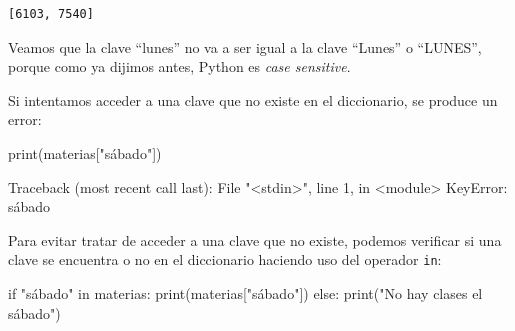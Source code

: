 \documentclass[
  letterpaper,
  DIV=11,
  numbers=noendperiod]{scrreprt}
\newenvironment{Shaded}{\begin{snugshade}}{\end{snugshade}}
\newcommand{\BuiltInTok}[1]{\textcolor[rgb]{0.00,0.23,0.31}{#1}}
\newcommand{\ControlFlowTok}[1]{\textcolor[rgb]{0.00,0.23,0.31}{#1}}
\newcommand{\KeywordTok}[1]{\textcolor[rgb]{0.00,0.23,0.31}{#1}}
\newcommand{\NormalTok}[1]{\textcolor[rgb]{0.00,0.23,0.31}{#1}}
\newcommand{\StringTok}[1]{\textcolor[rgb]{0.13,0.47,0.30}{#1}}
\begin{document}
\begin{verbatim}
[6103, 7540]
\end{verbatim}

Veamos que la clave ``lunes'' no va a ser igual a la clave ``Lunes'' o
``LUNES'', porque como ya dijimos antes, Python es \emph{case
sensitive}.

\begin{tcolorbox}[enhanced jigsaw, bottomrule=.15mm, leftrule=.75mm, opacityback=0, colback=white, toprule=.15mm, bottomtitle=1mm, opacitybacktitle=0.6, rightrule=.15mm, left=2mm, arc=.35mm, coltitle=black, title=\textcolor{quarto-callout-warning-color}{\faExclamationTriangle}\hspace{0.5em}{¡Cuidado! Acceso a Claves que no Existen}, breakable, toptitle=1mm, colframe=quarto-callout-warning-color-frame, titlerule=0mm, colbacktitle=quarto-callout-warning-color!10!white]

Si intentamos acceder a una clave que no existe en el diccionario, se
produce un error:

\begin{Shaded}
\begin{Highlighting}[]
\BuiltInTok{print}\NormalTok{(materias[}\StringTok{"sábado"}\NormalTok{])}
\end{Highlighting}
\end{Shaded}

\begin{Shaded}
\begin{Highlighting}[]
\NormalTok{Traceback (most recent call last):}
\NormalTok{File "\textless{}stdin\textgreater{}", line 1, in \textless{}module\textgreater{}}
\NormalTok{KeyError: \textquotesingle{}sábado\textquotesingle{}}
\end{Highlighting}
\end{Shaded}

\end{tcolorbox}

\hfill\break
Para evitar tratar de acceder a una clave que no existe, podemos
verificar si una clave se encuentra o no en el diccionario haciendo uso
del operador \texttt{in}:

\begin{Shaded}
\begin{Highlighting}[]
\ControlFlowTok{if} \StringTok{"sábado"} \KeywordTok{in}\NormalTok{ materias:}
    \BuiltInTok{print}\NormalTok{(materias[}\StringTok{"sábado"}\NormalTok{])}
\ControlFlowTok{else}\NormalTok{:}
    \BuiltInTok{print}\NormalTok{(}\StringTok{"No hay clases el sábado"}\NormalTok{)}
\end{Highlighting}
\end{Shaded}
\end{document}
